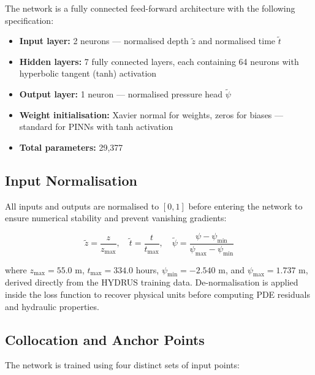 \documentclass[12pt]{report}
\begin{document}
The network is a fully connected feed-forward architecture with the
following specification:

\begin{itemize}
    \item \textbf{Input layer:} 2 neurons — normalised depth
    $\tilde{z}$ and normalised time $\tilde{t}$

    \item \textbf{Hidden layers:} 7 fully connected layers, each
    containing 64 neurons with hyperbolic tangent (tanh) activation

    \item \textbf{Output layer:} 1 neuron — normalised pressure head
    $\tilde{\psi}$

    \item \textbf{Weight initialisation:} Xavier normal for weights,
    zeros for biases — standard for PINNs with tanh activation

    \item \textbf{Total parameters:} 29,377
\end{itemize}

\subsection{Input Normalisation}

All inputs and outputs are normalised to $[0, 1]$ before entering the
network to ensure numerical stability and prevent vanishing gradients:

\begin{equation}
\tilde{z} = \frac{z}{z_{\max}}, \quad
\tilde{t} = \frac{t}{t_{\max}}, \quad
\tilde{\psi} = \frac{\psi - \psi_{\min}}{\psi_{\max} - \psi_{\min}}
\end{equation}

where $z_{\max} = 55.0$ m, $t_{\max} = 334.0$ hours,
$\psi_{\min} = -2.540$ m, and $\psi_{\max} = 1.737$ m, derived directly from the HYDRUS training data.
De-normalisation is applied inside the loss function to recover
physical units before computing PDE residuals and hydraulic properties.

\subsection{Collocation and Anchor Points}

The network is trained using four distinct sets of input points:
\end{document}
